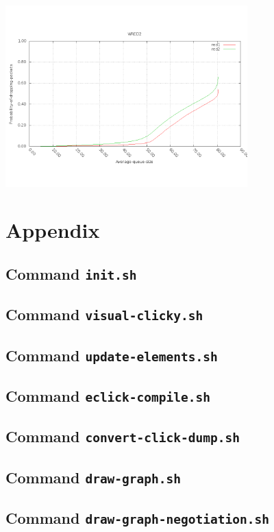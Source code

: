 \documentclass[a4paper]{article}
\begin{document}
  \begin{center}
	\includegraphics[width=0.70\textwidth]{wred2.png}
	\label{fig:test-wred2}
  \end{center}
  \newpage
  \appendix
  \section{Appendix}

  \subsection{Command \texttt{init.sh}}
  

  \subsection{Command \texttt{visual-clicky.sh}}
  

  \subsection{Command \texttt{update-elements.sh}}
  
  
  \subsection{Command \texttt{eclick-compile.sh}}
  

  \subsection{Command \texttt{convert-click-dump.sh}}
  
  
  \subsection{Command \texttt{draw-graph.sh}}
  
  
  \subsection{Command \texttt{draw-graph-negotiation.sh}}
  
\end{document}
